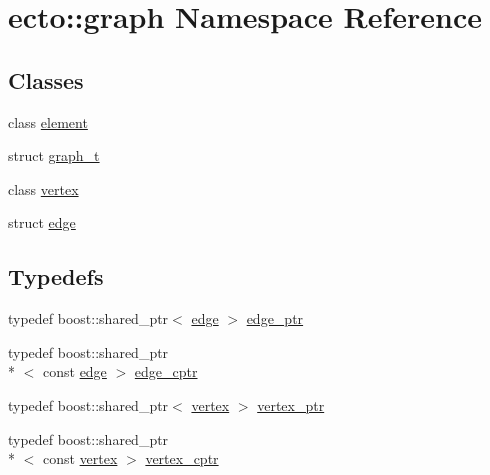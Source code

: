 \hypertarget{namespaceecto_1_1graph}{\section{ecto\-:\-:graph Namespace Reference}
\label{namespaceecto_1_1graph}
}
\subsection*{Classes}
\begin{DoxyCompactItemize}
\item 
class \hyperlink{classecto_1_1graph_1_1element}{element}
\item 
struct \hyperlink{structecto_1_1graph_1_1graph__t}{graph\-\_\-t}
\item 
class \hyperlink{classecto_1_1graph_1_1vertex}{vertex}
\item 
struct \hyperlink{structecto_1_1graph_1_1edge}{edge}
\end{DoxyCompactItemize}
\subsection*{Typedefs}
\begin{DoxyCompactItemize}
\item 
typedef boost\-::shared\-\_\-ptr$<$ \hyperlink{structecto_1_1graph_1_1edge}{edge} $>$ \hyperlink{namespaceecto_1_1graph_ad6da390ef18395607e6eab139f37fcf4}{edge\-\_\-ptr}
\item 
typedef boost\-::shared\-\_\-ptr\\*
$<$ const \hyperlink{structecto_1_1graph_1_1edge}{edge} $>$ \hyperlink{namespaceecto_1_1graph_ac45fa43674f9071675a1ebbf4d021eb4}{edge\-\_\-cptr}
\item 
typedef boost\-::shared\-\_\-ptr$<$ \hyperlink{classecto_1_1graph_1_1vertex}{vertex} $>$ \hyperlink{namespaceecto_1_1graph_a878e413dd7cdb7395b02f5be20e12b51}{vertex\-\_\-ptr}
\item 
typedef boost\-::shared\-\_\-ptr\\*
$<$ const \hyperlink{classecto_1_1graph_1_1vertex}{vertex} $>$ \hyperlink{namespaceecto_1_1graph_ab1ad7248e81caff384fed98d61fca8ca}{vertex\-\_\-cptr}
\end{DoxyCompactItemize}
